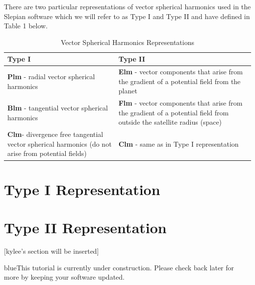 \documentclass[11pt]{article}
\newcommand{\TAG}{\begin{color}{blue}This tutorial is currently under construction. Please check back later for more by keeping your software updated.\end{color}}
\begin{document}
There are two particular representations of vector spherical harmonics used in the Slepian software which we will refer to as Type I and Type II and have defined in Table 1 below.

\begin{table}[H]
\caption{Vector Spherical Harmonics Representations}
\begin{tabulary}{\linewidth}{L{7cm}|L{8cm}}
\textbf{Type I} & \textbf{Type II} \\ \hline
   \textbf{Plm} - radial vector spherical harmonics & \textbf{Elm} - vector components that arise from the gradient of a potential field from the planet \\
   \textbf{Blm} - tangential vector spherical harmonics & \textbf{Flm} - vector components that arise from the gradient of a potential field from outside the satellite radius (space) \\
   \textbf{Clm}- divergence free tangential vector spherical harmonics (do not arise from potential fields) & \textbf{Clm} - same as in Type I representation
\end{tabulary}
\end{table}

\section{Type I Representation}



\section{Type II Representation}


[kylee's section will be inserted] \\

\TAG
\end{document}
